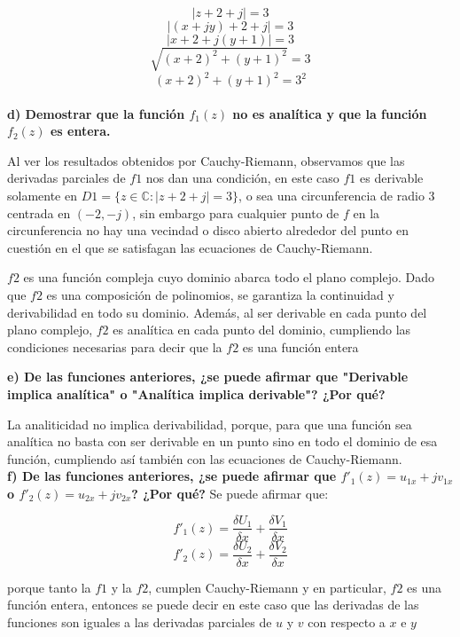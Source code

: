 \documentclass[12pt]{report}
\begin{document}
$$|z+2+j|=3$$
$$|(x+jy)+2+j|=3$$
$$|x+2+j(y+1)|=3$$
$$\sqrt{(x+2)^2+(y+1)^2}=3$$
$$(x+2)^2+(y+1)^2=3^2$$\\

\textbf{d) Demostrar que la función $f_1(z)$ no es analítica y que la función $f_2(z)$ es entera.}

Al ver los resultados obtenidos por Cauchy-Riemann, observamos que las derivadas parciales de $f1$ nos dan una condición, en este caso $f1$ es derivable solamente
en $D1 = \{z \in \mathbb{C} : |z + 2 + j| = 3\}$, o sea una circunferencia de radio $3$ centrada en $(-2, -j)$, sin embargo para cualquier punto de $f$ en la
circunferencia no hay una vecindad o disco abierto alrededor del punto en cuestión en el que se satisfagan las ecuaciones de Cauchy-Riemann.

$f2$ es una función compleja cuyo dominio abarca todo el plano complejo. Dado que $f2$ es una composición de polinomios, se garantiza la continuidad y
derivabilidad en todo su dominio. Además, al ser derivable en cada punto del plano complejo, $f2$ es analítica en cada punto del dominio, cumpliendo las
condiciones necesarias para decir que la $f2$ es una función entera

\textbf{e) De las funciones anteriores, ¿se puede afirmar que "Derivable implica analítica" o "Analítica implica derivable"? ¿Por qué?}

La analiticidad no implica derivabilidad, porque, para que una función sea analítica no basta con ser derivable en un punto sino en todo el dominio de esa
función, cumpliendo así también con las ecuaciones de Cauchy-Riemann.\\

\textbf{f) De las funciones anteriores, ¿se puede afirmar que $f'_1(z) = u_{1x} + jv_{1x}$ o $f'_2(z) = u_{2x} + jv_{2x}$? ¿Por qué?}
Se puede afirmar que:

$$f'_1(z)=\frac{\delta U_1}{\delta x}+\frac{\delta V_1}{\delta x}$$
$$f'_2(z)=\frac{\delta U_2}{\delta x}+\frac{\delta V_2}{\delta x}$$

porque tanto la $f1$ y la $f2$, cumplen Cauchy-Riemann y en particular, $f2$ es una función entera, entonces se puede decir en este caso que las derivadas de las
funciones son iguales a las derivadas parciales de $u$ y $v$ con respecto a $x$ e $y$

\chapter{}%
\end{document}
